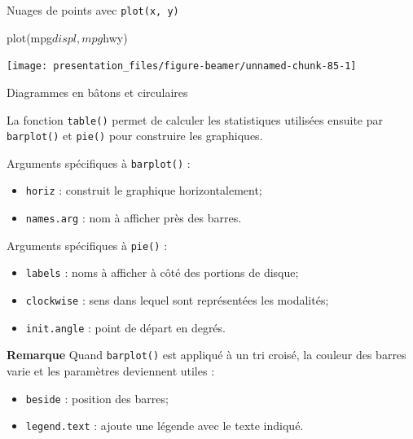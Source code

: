 \documentclass[12pt,handout,ignorenonframetext,]{beamer}
\newenvironment{Shaded}{}{}
\newcommand{\KeywordTok}[1]{\textcolor[rgb]{0.00,0.00,1.00}{{#1}}}
\newcommand{\NormalTok}[1]{{#1}}
\providecommand{\tightlist}{%
\setlength{\itemsep}{0pt}\setlength{\parskip}{0pt}}
\renewenvironment{Shaded}{\begin{snugshade}}{\end{snugshade}}
\begin{document}
\begin{frame}[fragile]{Nuages de points avec \texttt{plot(x,\ y)}}

\centering \footnotesize

\begin{Shaded}
\begin{Highlighting}[]
\KeywordTok{plot}\NormalTok{(mpg$displ, mpg$hwy)}
\end{Highlighting}
\end{Shaded}

\texttt{[image: presentation\_files/figure-beamer/unnamed-chunk-85-1]}

\end{frame}

\begin{frame}[fragile]{Diagrammes en bâtons et circulaires}

La fonction \texttt{table()} permet de calculer les statistiques
utilisées ensuite par \texttt{barplot()} et \texttt{pie()} pour
construire les graphiques.

\pause Arguments spécifiques à \texttt{barplot()} : \vspace{-3mm}

\begin{itemize}
\tightlist
\item
  \texttt{horiz} : construit le graphique horizontalement;
\item
  \texttt{names.arg} : nom à afficher près des barres.
\end{itemize}

\pause Arguments spécifiques à \texttt{pie()} : \vspace{-3mm}

\begin{itemize}
\tightlist
\item
  \texttt{labels} : noms à afficher à côté des portions de disque;
\item
  \texttt{clockwise} : sens dans lequel sont représentées les modalités;
\item
  \texttt{init.angle} : point de départ en degrés.
\end{itemize}

\pause

\textbf{Remarque} Quand \texttt{barplot()} est appliqué à un tri croisé,
la couleur des barres varie et les paramètres deviennent utiles :
\vspace{-3mm}

\begin{itemize}
\tightlist
\item
  \texttt{beside} : position des barres;
\item
  \texttt{legend.text} : ajoute une légende avec le texte indiqué.
\end{itemize}

\end{frame}
\end{document}
